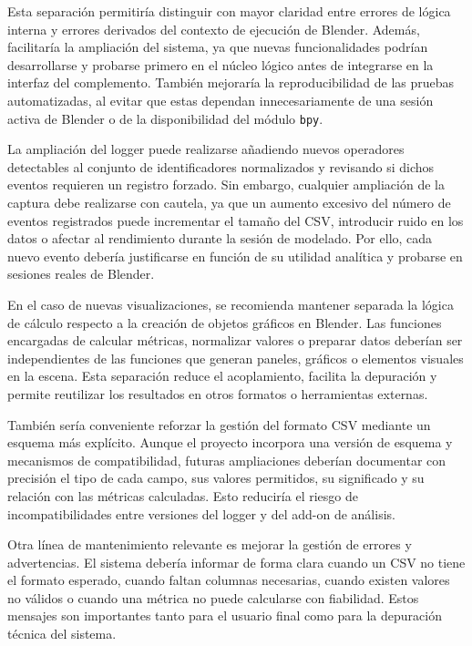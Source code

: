 Esta separación permitiría distinguir con mayor claridad entre errores de lógica interna y errores derivados del contexto de ejecución de Blender. Además, facilitaría la ampliación del sistema, ya que nuevas funcionalidades podrían desarrollarse y probarse primero en el núcleo lógico antes de integrarse en la interfaz del complemento. También mejoraría la reproducibilidad de las pruebas automatizadas, al evitar que estas dependan innecesariamente de una sesión activa de Blender o de la disponibilidad del módulo \texttt{bpy}.

La ampliación del logger puede realizarse añadiendo nuevos operadores detectables al conjunto de identificadores normalizados y revisando si dichos eventos requieren un registro forzado. Sin embargo, cualquier ampliación de la captura debe realizarse con cautela, ya que un aumento excesivo del número de eventos registrados puede incrementar el tamaño del CSV, introducir ruido en los datos o afectar al rendimiento durante la sesión de modelado. Por ello, cada nuevo evento debería justificarse en función de su utilidad analítica y probarse en sesiones reales de Blender.

En el caso de nuevas visualizaciones, se recomienda mantener separada la lógica de cálculo respecto a la creación de objetos gráficos en Blender. Las funciones encargadas de calcular métricas, normalizar valores o preparar datos deberían ser independientes de las funciones que generan paneles, gráficos o elementos visuales en la escena. Esta separación reduce el acoplamiento, facilita la depuración y permite reutilizar los resultados en otros formatos o herramientas externas.

También sería conveniente reforzar la gestión del formato CSV mediante un esquema más explícito. Aunque el proyecto incorpora una versión de esquema y mecanismos de compatibilidad, futuras ampliaciones deberían documentar con precisión el tipo de cada campo, sus valores permitidos, su significado y su relación con las métricas calculadas. Esto reduciría el riesgo de incompatibilidades entre versiones del logger y del add-on de análisis.

Otra línea de mantenimiento relevante es mejorar la gestión de errores y advertencias. El sistema debería informar de forma clara cuando un CSV no tiene el formato esperado, cuando faltan columnas necesarias, cuando existen valores no válidos o cuando una métrica no puede calcularse con fiabilidad. Estos mensajes son importantes tanto para el usuario final como para la depuración técnica del sistema.

